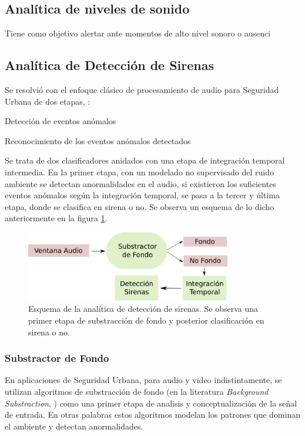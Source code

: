 \documentclass{article}
\begin{document}
\subsection{Analítica de niveles de sonido}
Tiene como objetivo alertar ante momentos de alto nivel sonoro o ausenci

\subsection{Analítica de Detección de Sirenas}
Se resolvió con el enfoque clásico de procesamiento de audio para Seguridad Urbana de dos etapas, \cite{lecomte2011abnormal}:
\begin{enumerate}
\begin{item}
Detección de eventos anómalos
\end{item}
\begin{item}
Reconocimiento de los eventos anómalos detectados
\end{item}
\end{enumerate}

Se trata de dos clasificadores anidados con una etapa de integración temporal intermedia. En la primer etapa, con un modelado no supervisado del ruido ambiente se detectan anormalidades en el audio, si existieron los suficientes eventos anómalos según la integración temporal, se pasa a la tercer y última etapa, donde se clasifica en sirena o no. Se observa un esquema de lo dicho anteriormente en la figura \ref{fig:deteccion_sirenas}. 
 
\begin{figure}[h]
\begin{center}
\includegraphics[width=0.8\textwidth]{deteccion_sirenas} 
\caption{Esquema de la analítica de detección de sirenas. Se observa una primer etapa de substracción de fondo y posterior clasificación en sirena o no.}
\label{fig:deteccion_sirenas}
\end{center}
\end{figure}

\subsubsection{Substractor de Fondo}
En aplicaciones de Seguridad Urbana, para audio y video indistintamente, se utilizan algoritmos de substracción de fondo (en la literatura \textit{Background Substraction}, \cite{Crocco:2016:ASS:2891449.2871183}) como una primer etapa de analisis y conceptualización de la señal de entrada. En otras palabras estos algoritmos modelan los patrones que dominan el ambiente y detectan anormalidades.
\smallskip 
\end{document}

